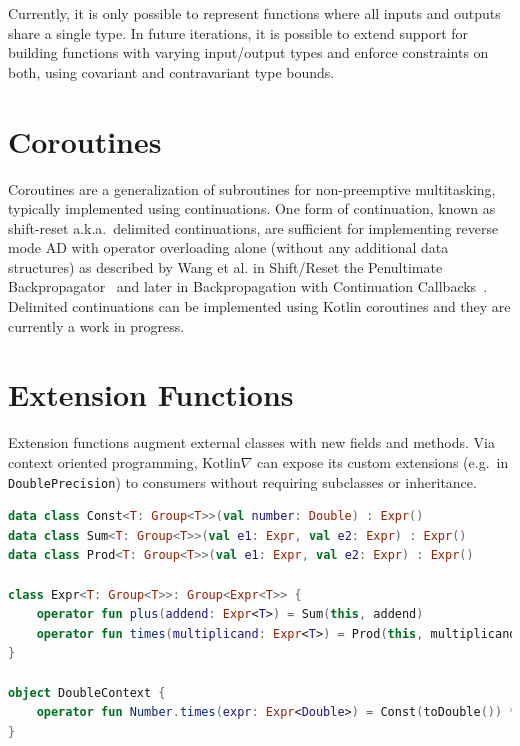 \documentclass[12pt,initial,twoside,maitrise]{dms}
\numberwithin{equation}{section}
\numberwithin{table}{chapter}
\numberwithin{figure}{chapter}
\begin{document}
Currently, it is only possible to represent functions where all inputs and outputs share a single type. In future iterations, it is possible to extend support for building functions with varying input/output types and enforce constraints on both, using covariant and contravariant type bounds.

\section{Coroutines}\label{sec:coroutines}

Coroutines are a generalization of subroutines for non-preemptive multitasking, typically implemented using continuations. One form of continuation, known as shift-reset a.k.a.\ delimited continuations, are sufficient for implementing reverse mode AD with operator overloading alone (without any additional data structures) as described by Wang et al. in Shift/Reset the Penultimate Backpropagator~\cite{wang2018demystifying} and later in Backpropagation with Continuation Callbacks~\cite{wang2018backpropagation}. Delimited continuations can be implemented using Kotlin coroutines and they are currently a work in progress.

\section{Extension Functions}\label{sec:extension-functions}

Extension functions augment external classes with new fields and methods. Via context oriented programming, Kotlin$\nabla$ can expose its custom extensions (e.g.\ in \texttt{DoublePrecision}) to consumers without requiring subclasses or inheritance.

\begin{lstlisting}[caption={Using extension functions we can provide numerical conversions for common data types, wrapped by a Context.}, language=Kotlin]
data class Const<T: Group<T>>(val number: Double) : Expr()
data class Sum<T: Group<T>>(val e1: Expr, val e2: Expr) : Expr()
data class Prod<T: Group<T>>(val e1: Expr, val e2: Expr) : Expr()

class Expr<T: Group<T>>: Group<Expr<T>> {
    operator fun plus(addend: Expr<T>) = Sum(this, addend)
    operator fun times(multiplicand: Expr<T>) = Prod(this, multiplicand)
}

object DoubleContext {
    operator fun Number.times(expr: Expr<Double>) = Const(toDouble()) * expr
}
\end{lstlisting}
\end{document}
